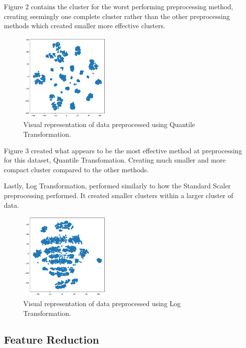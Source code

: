 \documentclass[twocolumn]{article}
\begin{document}
Figure 2 contains the cluster for the worst performing preprocessing method, creating seemingly one complete cluster rather than the other preprocessing methods which created smaller more effective clusters.

\begin{figure}
    \centering
    \includegraphics[width=0.4\textwidth]{images/quantile_transform.png}
    \caption{Visual representation of data preprocessed using Quantile Transformation.}
\end{figure}

Figure 3 created what appears to be the most effective method at preprocessing for this dataset, Quantile Transfomation. Creating much smaller and more compact cluster compared to the other methods.

Lastly, Log Transformation, performed similarly to how the Standard Scaler preprocessing performed. It created smaller clusters within a larger cluster of data. 

\begin{figure}
    \centering
    \includegraphics[width=0.4\textwidth]{images/log_transformed.png}
    \caption{Visual representation of data preprocessed using Log Transformation.}
\end{figure}


\subsection{Feature Reduction}
\end{document}
